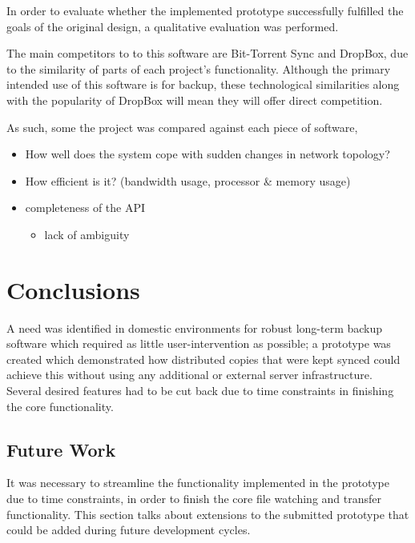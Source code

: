 \documentclass[12pt,a4paper,]{adreport}
\begin{document}
In order to evaluate whether the implemented prototype successfully
fulfilled the goals of the original design, a qualitative evaluation was
performed.

The main competitors to to this software are Bit-Torrent Sync and
DropBox, due to the similarity of parts of each project's functionality.
Although the primary intended use of this software is for backup, these
technological similarities along with the popularity of DropBox will
mean they will offer direct competition.

As such, some the project was compared against each piece of software,

\begin{itemize}
\itemsep1pt\parskip0pt
\item
  How well does the system cope with sudden changes in network topology?
\item
  How efficient is it? (bandwidth usage, processor \& memory usage)
\item
  completeness of the API

  \begin{itemize}
  \itemsep1pt\parskip0pt
  \item
    lack of ambiguity
  \end{itemize}
\end{itemize}

\chapter{Conclusions}\label{conclusions}

A need was identified in domestic environments for robust long-term
backup software which required as little user-intervention as possible; a prototype was created which demonstrated how distributed copies that were kept synced could achieve this without using any additional or external server infrastructure. Several desired features had to be cut back due to time constraints in finishing the core functionality.

\section{Future Work}\label{future-work}

It was necessary to streamline the functionality implemented in the
prototype due to time constraints, in order to finish the core file
watching and transfer functionality. This section talks about extensions
to the submitted prototype that could be added during future development
cycles.
\end{document}
